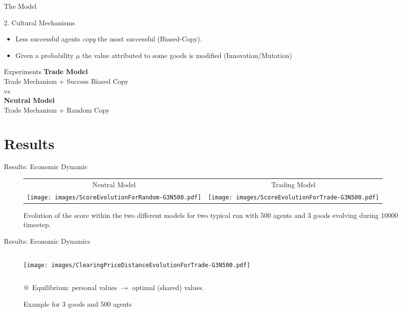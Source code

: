 \documentclass[12pt, notes=show]{beamer}
\begin{document}
	\begin{frame}{The Model}
		\begin{block}{2. Cultural Mechanisms}
			\begin{itemize}
					\vfill
				\item Less successful agents \emph{copy} the most successful (Biased-Copy).
					\vfill
				\item Given a probability $\mu$ the value attributed to some goods is modified (Innovation/Mutation)
			\end{itemize}
		\end{block}
	\end{frame}
\begin{frame}{Experiments}
	\centering
	\textbf{Trade Model} \\Trade Mechanism + Success Biased Copy\\
	\vfill
	vs\\
	\vfill
	\textbf{Neutral Model}\\ Trade Mechanism + Random Copy\\
	 

\end{frame}


\section{Results}



\begin{frame}{Results: Economic Dynamic}
    \begin{figure}[!h]
	\centering
	\begin{tabular}{ c c}
	    Neutral Model & Trading Model \\
	    \texttt{[image: images/ScoreEvolutionForRandom-G3N500.pdf]}
	    & \texttt{[image: images/ScoreEvolutionForTrade-G3N500.pdf]}

	\end{tabular}
	\caption{Evolution of the score within the two different models for two typical run with 500 agents and 3 goods evolving during 10000 timestep.}%
	\label{fig:scoreEvol}
    \end{figure}
\end{frame}
    


\begin{frame}{Results: Economic Dynamics}
	\begin{figure}
	    \caption{Example for 3 goods and 500 agents}
	    \begin{columns}
		\texttt{[image: images/ClearingPriceDistanceEvolutionForTrade-G3N500.pdf]}\\
	    \end{columns}
		@~Equilibrium: personal values  $\rightarrow$ optimal (shared) values.
	\end{figure}
	
\end{frame}
\end{document}
